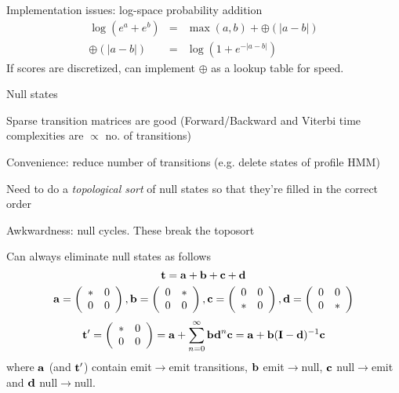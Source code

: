 \documentclass{beamer}
\begin{document}
\begin{frame}{}
Implementation issues: log-space probability addition
\begin{eqnarray*}
\log(e^a+e^b) & = & \max(a,b) + \oplus(|a-b|) \\
\oplus(|a-b|) & = & \log(1+e^{-|a-b|})
\end{eqnarray*}
If scores are discretized, can implement $\oplus$ as a lookup table for speed.
\end{frame}

\begin{frame}{}
Null states
 \itemb
 \item Sparse transition matrices are good (Forward/Backward and Viterbi time complexities are $\propto$ no. of transitions)
 \item Convenience: reduce number of transitions (e.g. delete states of profile HMM)
 \item Need to do a {\em topological sort} of null states so that they're filled in the correct order
 \item Awkwardness: null cycles. These break the toposort
 \iteme
\end{frame}

\begin{frame}{}
\small
Can always eliminate null states as follows
\[
{\bf t} = {\bf a} + {\bf b} + {\bf c} + {\bf d}
\]
\[
{\bf a} = \left( \begin{array}{ll} \ast & 0 \\ 0 & 0 \end{array} \right),
{\bf b} = \left( \begin{array}{ll} 0 & \ast \\ 0 & 0 \end{array} \right),
{\bf c} = \left( \begin{array}{ll} 0 & 0 \\ \ast & 0 \end{array} \right),
{\bf d} = \left( \begin{array}{ll} 0 & 0 \\ 0 & \ast \end{array} \right)
\]
\[
{\bf t}' = \left( \begin{array}{ll} \ast & 0 \\ 0 & 0 \end{array} \right)
= {\bf a} + \sum_{n=0}^\infty {\bf bd}^n {\bf c} = {\bf a} + {\bf b} ({\bf I} - {\bf d})^{-1} {\bf c}
\]
where ${\bf a}$ (and ${\bf t}'$) contain emit$\to$emit transitions,
 ${\bf b}$ emit$\to$null,
 ${\bf c}$ null$\to$emit and
 ${\bf d}$ null$\to$null.
\end{frame}
\end{document}
